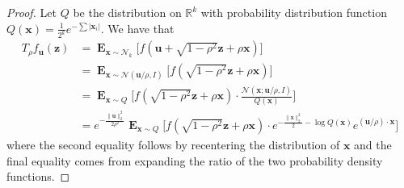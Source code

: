 \documentclass[10pt,a4paper]{article}
\newcommand\twonorm[1]{\|#1\|_2}
\renewcommand\vec[1]{\mathbf{#1}}
\DeclareMathOperator*{\E}{\mathbf{E}}
\newcommand{\R}{\mathbb{R}}
\newcommand{\1}{\Ind}
\newcommand{\x}{\vec x}
\newcommand{\vu}{\vec u}
\newcommand{\z}{\vec z}
\newcommand{\Gauss}{\mathcal{N}}
\begin{document}
\begin{proof}
    Let $Q$ be the distribution on $\R^k$ with probability distribution function $Q(\x)=\frac{1}{2^k}e^{-\sum{|\x_i|}}$. We have that 
    \begin{align*}
        T_{\rho}f_{\vu}(\z)&=\E_{\x\sim \Gauss_k}\bigl[f(\vu+\sqrt{1-\rho^2}\z+\rho\x)\bigr]\\
        &=\E_{\x\sim \Gauss(\vu/\rho,I)}\bigl[f(\sqrt{1-\rho^2}\z+\rho\x)\bigr]\\
        &=\E_{\x\sim Q}\biggl[f(\sqrt{1-\rho^2}\z+\rho\x)\cdot \frac{\Gauss(\x;\vu/\rho,I)}{Q(\x)}\biggr]\\
        &=e^{-\frac{\twonorm{\vu}^2}{2\rho^2}}\E_{\x\sim Q}\biggl[f(\sqrt{1-\rho^2}\z+\rho\x)\cdot e^{-\frac{\twonorm{\x}^2}{2}-\log Q(\x)}e^{ (\vu/\rho)\cdot\x}\biggr]
    \end{align*}
    where the second equality follows by recentering the distribution of $\x$ and the final equality comes from expanding the ratio of the two probability density functions. 
    

\end{proof}
\end{document}
